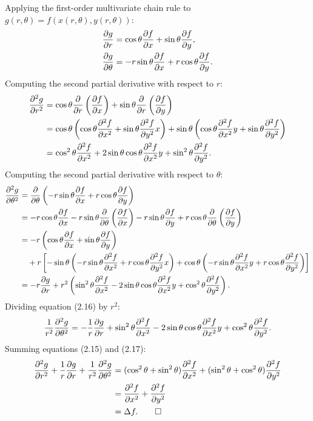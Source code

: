 \begin{demonstration}
Applying the first-order multivariate chain rule to $g(r, \theta) = f(x(r,\theta), y(r,\theta))$:
\begin{align}
    \pdv{g}{r} &= \cos\theta \pdv{f}{x} + \sin\theta \pdv{f}{y}, \\
    \pdv{g}{\theta} &= -r\sin\theta \pdv{f}{x} + r\cos\theta \pdv{f}{y}.
\end{align}
Computing the second partial derivative with respect to $r$:
\begin{align}
    \pdv[2]{g}{r} &= \cos\theta \pdv{}{r}\left(\pdv{f}{x}\right) + \sin\theta \pdv{}{r}\left(\pdv{f}{y}\right) \notag \\
    &= \cos\theta \left( \cos\theta \pdv[2]{f}{x} + \sin\theta \pdv[2]{f}{y}{x} \right) + \sin\theta \left( \cos\theta \pdv[2]{f}{x}{y} + \sin\theta \pdv[2]{f}{y} \right) \notag \\
    &= \cos^2\theta \pdv[2]{f}{x} + 2\sin\theta\cos\theta \pdv[2]{f}{x}{y} + \sin^2\theta \pdv[2]{f}{y}.
\end{align}
Computing the second partial derivative with respect to $\theta$:
\begin{align}
    \pdv[2]{g}{\theta} &= \pdv{}{\theta}\left(-r\sin\theta \pdv{f}{x} + r\cos\theta \pdv{f}{y}\right) \notag \\
    &= -r\cos\theta \pdv{f}{x} - r\sin\theta \pdv{}{\theta}\left(\pdv{f}{x}\right) - r\sin\theta \pdv{f}{y} + r\cos\theta \pdv{}{\theta}\left(\pdv{f}{y}\right) \notag \\
    &= -r \left(\cos\theta \pdv{f}{x} + \sin\theta \pdv{f}{y}\right) \notag \\
    &\quad + r \left[ -\sin\theta \left(-r\sin\theta \pdv[2]{f}{x} + r\cos\theta \pdv[2]{f}{y}{x}\right) + \cos\theta \left(-r\sin\theta \pdv[2]{f}{x}{y} + r\cos\theta \pdv[2]{f}{y}\right) \right] \notag \\
    &= -r \pdv{g}{r} + r^2 \left( \sin^2\theta \pdv[2]{f}{x} - 2\sin\theta\cos\theta \pdv[2]{f}{x}{y} + \cos^2\theta \pdv[2]{f}{y} \right).
\end{align}
Dividing equation (2.16) by $r^2$:
\begin{equation}
    \frac{1}{r^2}\pdv[2]{g}{\theta} = -\frac{1}{r}\pdv{g}{r} + \sin^2\theta \pdv[2]{f}{x} - 2\sin\theta\cos\theta \pdv[2]{f}{x}{y} + \cos^2\theta \pdv[2]{f}{y}.
\end{equation}
Summing equations (2.15) and (2.17):
\begin{align*}
    \pdv[2]{g}{r} + \frac{1}{r}\pdv{g}{r} + \frac{1}{r^2}\pdv[2]{g}{\theta} &= (\cos^2\theta + \sin^2\theta)\pdv[2]{f}{x} + (\sin^2\theta + \cos^2\theta)\pdv[2]{f}{y} \\
    &= \pdv[2]{f}{x} + \pdv[2]{f}{y} \\
    &= \laplacian f. \qedhere
\end{align*}
\end{demonstration}